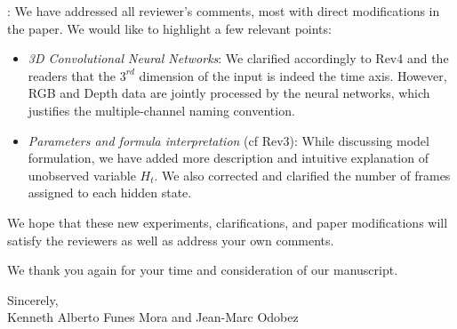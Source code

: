\documentclass[12pt]{article}
\begin{document}
: We have addressed all reviewer's comments, most with direct modifications in the paper. We would like to
highlight a few relevant points:
\begin{itemize}
%
 \item {\em 3D Convolutional Neural Networks}: We clarified accordingly to Rev4 and the readers that the $3^{rd}$ dimension of the input is indeed the time axis. However, RGB and Depth data are jointly processed by the neural networks, which justifies the multiple-channel naming convention.
%
 \item {\em Parameters and formula interpretation} (cf Rev3): While discussing model formulation, we have added more description and intuitive explanation of unobserved variable $\ensuremath{H}\xspace_t$. We also corrected and clarified the number of frames assigned to each hidden state.
\end{itemize}

We hope that these new experiments, clarifications, and paper modifications will satisfy the reviewers as well as address your own comments.

\vspace*{2mm}
We thank you again for your time and consideration of our manuscript.




\vspace*{8mm}

\noindent Sincerely,\\[3mm]
%
Kenneth Alberto Funes Mora and Jean-Marc Odobez



\newpage
\end{document}
